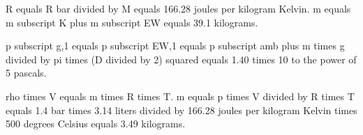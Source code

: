 R equals R bar divided by M equals 166.28 joules per kilogram Kelvin.  
m equals m subscript K plus m subscript EW equals 39.1 kilograms.  

p subscript g,1 equals p subscript EW,1 equals p subscript amb plus m times g divided by pi times (D divided by 2) squared equals 1.40 times 10 to the power of 5 pascals.  

rho times V equals m times R times T.  
m equals p times V divided by R times T equals 1.4 bar times 3.14 liters divided by 166.28 joules per kilogram Kelvin times 500 degrees Celsius equals 3.49 kilograms.
